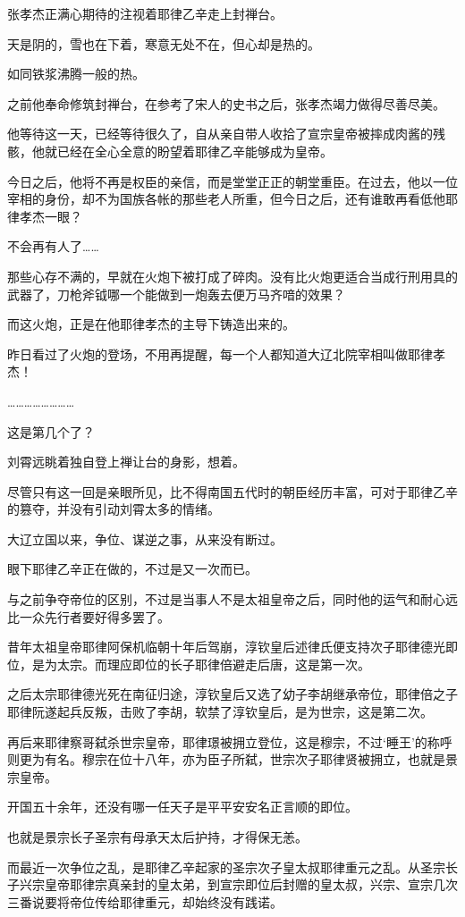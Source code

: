 张孝杰正满心期待的注视着耶律乙辛走上封禅台。

天是阴的，雪也在下着，寒意无处不在，但心却是热的。

如同铁浆沸腾一般的热。

之前他奉命修筑封禅台，在参考了宋人的史书之后，张孝杰竭力做得尽善尽美。

他等待这一天，已经等待很久了，自从亲自带人收拾了宣宗皇帝被摔成肉酱的残骸，他就已经在全心全意的盼望着耶律乙辛能够成为皇帝。

今日之后，他将不再是权臣的亲信，而是堂堂正正的朝堂重臣。在过去，他以一位宰相的身份，却不为国族各帐的那些老人所重，但今日之后，还有谁敢再看低他耶律孝杰一眼？

不会再有人了……

那些心存不满的，早就在火炮下被打成了碎肉。没有比火炮更适合当成行刑用具的武器了，刀枪斧钺哪一个能做到一炮轰去便万马齐喑的效果？

而这火炮，正是在他耶律孝杰的主导下铸造出来的。

昨日看过了火炮的登场，不用再提醒，每一个人都知道大辽北院宰相叫做耶律孝杰！

……………………

这是第几个了？

刘霄远眺着独自登上禅让台的身影，想着。

尽管只有这一回是亲眼所见，比不得南国五代时的朝臣经历丰富，可对于耶律乙辛的篡夺，并没有引动刘霄太多的情绪。

大辽立国以来，争位、谋逆之事，从来没有断过。

眼下耶律乙辛正在做的，不过是又一次而已。

与之前争夺帝位的区别，不过是当事人不是太祖皇帝之后，同时他的运气和耐心远比一众先行者要好得多罢了。

昔年太祖皇帝耶律阿保机临朝十年后驾崩，淳钦皇后述律氏便支持次子耶律德光即位，是为太宗。而理应即位的长子耶律倍避走后唐，这是第一次。

之后太宗耶律德光死在南征归途，淳钦皇后又选了幼子李胡继承帝位，耶律倍之子耶律阮遂起兵反叛，击败了李胡，软禁了淳钦皇后，是为世宗，这是第二次。

再后来耶律察哥弑杀世宗皇帝，耶律璟被拥立登位，这是穆宗，不过‘睡王’的称呼则更为有名。穆宗在位十八年，亦为臣子所弑，世宗次子耶律贤被拥立，也就是景宗皇帝。

开国五十余年，还没有哪一任天子是平平安安名正言顺的即位。

也就是景宗长子圣宗有母承天太后护持，才得保无恙。

而最近一次争位之乱，是耶律乙辛起家的圣宗次子皇太叔耶律重元之乱。从圣宗长子兴宗皇帝耶律宗真亲封的皇太弟，到宣宗即位后封赠的皇太叔，兴宗、宣宗几次三番说要将帝位传给耶律重元，却始终没有践诺。

